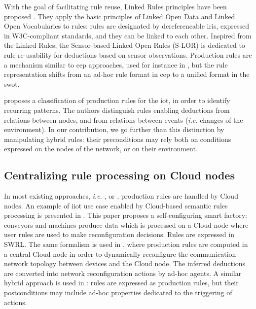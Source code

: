 \documentclass{iosart2c}
\begin{document}
With the goal of facilitating rule reuse, Linked Rules principles have been proposed \cite{Khandelwal2011}. 
They apply the basic principles of Linked Open Data and Linked Open Vocabularies to rules: rules are designated by dereferencable \gls{iri}s, expressed in W3C-compliant standards, and they can be linked to each other.
Inspired from the Linked Rules, the Sensor-based Linked Open Rules (S-LOR) \cite{Gyrard2017} is dedicated to rule re-usability for deductions based on sensor observations.
Production rules are a mechanism similar to \gls{cep} approaches, used for instance in \cite{ZangLi55}, but the rule representation shifts from an ad-hoc rule format in \gls{cep} to a unified format in the \gls{swot}. 

\cite{Sun2014} proposes a classification of production rules for the \gls{iot}, in order to identify recurring patterns.
The authors distinguish rules enabling deductions from relations between nodes, and from relations between events (\textit{i.e.} changes of the environment).
In our contribution, we go further than this distinction by manipulating hybrid rules: their preconditions may rely both on conditions expressed on the nodes of the network, or on their environment.

\subsection{Centralizing rule processing on Cloud nodes}

In most existing approaches, \textit{i.e.} \cite{ZangLi55}, \cite{Gyrard2017} or \cite{xu2017network}, production rules are handled by Cloud nodes.
An example of \gls{iiot} use case enabled by Cloud-based semantic rules processing is presented in \cite{Wang2018}.
This paper proposes a self-configuring smart factory: conveyors and machines produce data which is processed on a Cloud node where user rules are used to make reconfiguration decisions.
Rules are expressed in SWRL.
The same formalism is used in \cite{Rodriguez2010}, where production rules are computed in a central Cloud node in order to dynamically reconfigure the communication network topology between devices and the Cloud node.
The inferred deductions are converted into network reconfiguration actions by ad-hoc agents.
A similar hybrid approach is used in \cite{Evchina2015}: rules are expressed as production rules, but their postconditions may include ad-hoc properties dedicated to the triggering of actions.
\end{document}
